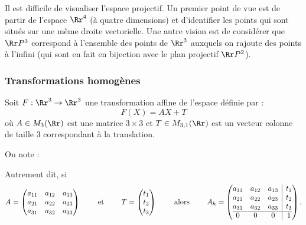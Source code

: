\documentclass[11pt,class=report,crop=false]{standalone}
\begin{document}
	
Il est difficile de visualiser l'espace projectif.
Un premier point de vue est de partir de l'espace $\Rr^4$ (à quatre dimensions) et d'identifier les points qui sont situés sur une même droite vectorielle.
Une autre vision est de considérer que $\Rr P^3$ correspond à l'ensemble des points de $\Rr^3$ auxquels on rajoute des points à l'infini (qui sont en fait en bijection avec le plan projectif $\Rr P^2$).  


\subsubsection*{Transformations homogènes}

Soit $F: \Rr^3 \to \Rr^3$ une transformation affine de l'espace définie par :
$$F(X) = AX + T$$
où $A \in M_3(\Rr)$ est une matrice $3\times 3$ et $T \in M_{3,1}(\Rr)$ est un vecteur colonne de taille $3$ correspondant à la translation.

On note :

Autrement dit, si 
$$A = \begin{pmatrix}
a_{11} & a_{12} & a_{13}\\
a_{21} & a_{22} & a_{23} \\
a_{31} & a_{32} & a_{33} \\
\end{pmatrix}
\qquad \text{ et } \qquad 
T = \begin{pmatrix} t_1 \\ t_2 \\ t_3 \end{pmatrix}
\qquad \text{ alors } \qquad 
A_h 
= \left(\begin{array}{@{}ccc|c@{}}
	a_{11} & a_{12} & a_{13} & t_1 \\
	a_{21} & a_{22} & a_{23} & t_2 \\
	a_{31} & a_{32} & a_{33} & t_3 \\\hline
	0      & 0      & 0      & 1 \\
\end{array}\right).
$$
\end{document}
